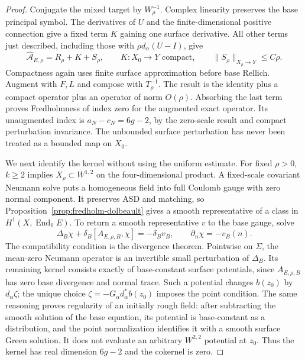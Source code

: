\documentclass[11pt]{amsart}
\theoremstyle{definition}
\theoremstyle{remark}
\theoremstyle{plain}
\newcommand{\End}{\operatorname{End}}
\begin{document}
\begin{proof}
Conjugate the mixed target by $W_\rho^{-1}$. Complex linearity
preserves the base principal symbol. The derivatives of $U$ and
the finite-dimensional positive connection give a fixed term $K$
gaining one surface derivative. All other terms just described,
including those with $\rho d_\alpha(U-I)$, give
\begin{equation}\label{eq:compact-parameter-decomposition}
 \widehat{\mathcal A}_{E,\rho}=R_\rho+K+S_\rho,
 \qquad K:X_0\to Y\text{ compact},\qquad
 \|S_\rho\|_{X_\rho\to Y}\leq C\rho.
\end{equation}
Compactness again uses finite surface approximation before base
Rellich. Augment with $F,L$ and compose with $T_\rho^{-1}$.
The result is the identity plus a compact operator plus an operator
of norm $O(\rho)$. Absorbing the last term proves Fredholmness
of index zero for the augmented exact operator. Its unaugmented
index is $a_N-c_N=6g-2$, by the zero-scale result and compact
perturbation invariance. The unbounded surface perturbation has
never been treated as a bounded map on $X_0$.

We next identify the kernel without using the uniform estimate.
For fixed $\rho>0$, $k\geq2$ implies $X_\rho\subset W^{1,2}$
on the four-dimensional product. A fixed-scale covariant Neumann
solve puts a homogeneous field into full Coulomb gauge with zero
normal component. It preserves ASD and matching, so
Proposition~\ref{prop:fredholm-dolbeault} gives a smooth
representative of a class in $H^1(X,\End_0E)$. To return a smooth
representative $v$ to the base gauge, solve
\begin{equation}\label{eq:compact-kernel-base-gauge}
 \Delta_B\chi+\delta_B[A_{E,\rho,B},\chi]=-\delta_Bv_B,
 \qquad \partial_n\chi=-v_B(n).
\end{equation}
The compatibility condition is the divergence theorem. Pointwise
on $\Sigma$, the mean-zero Neumann operator is an invertible small
perturbation of $\Delta_B$. Its remaining kernel consists exactly
of base-constant surface potentials, since $A_{E,\rho,B}$ has
zero base divergence and normal trace. Such a potential changes
$b(z_0)$ by $d_\alpha\zeta$; the unique choice
$\zeta=-G_\alpha d_\alpha^*b(z_0)$ imposes the point condition.
The same reasoning proves regularity of an initially rough field:
after subtracting the smooth solution of the base equation, its
potential is base-constant as a distribution, and the point
normalization identifies it with a smooth surface Green solution.
It does not evaluate an arbitrary $W^{2,2}$ potential at $z_0$.
Thus the kernel has real dimension $6g-2$ and the cokernel is zero.


\end{proof}
\end{document}
